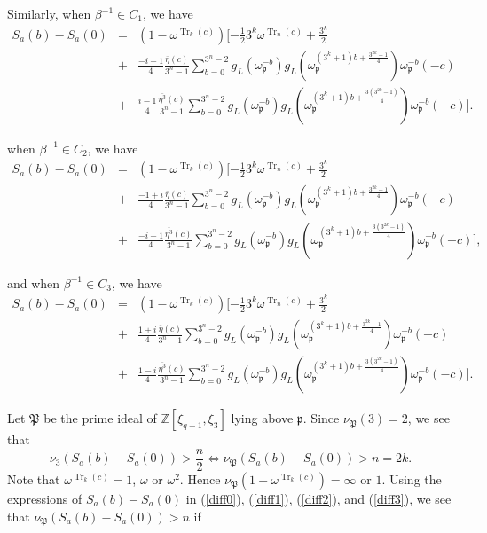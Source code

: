 \documentclass[11pt, reqno]{amsart}
\newcommand{\Zz}{{\mathbb Z}}
\def\Tr{\operatorname{Tr}}
\def\Tr{\operatorname{Tr}}
\begin{document}
Similarly, when $\beta^{-1} \in C_1$, we have
\begin{eqnarray}
S_a(b)-S_a(0)&=&(1-\omega^{\Tr_k(c)})[-\frac{1}{2}3^k\omega^{\Tr_n(c)}+\frac{3^k}{2}\nonumber \\
&+&\frac{-i-1}{4}\frac{\overline{\eta}(c)}{3^n-1}\sum_{b=0}^{3^n-2}g_L(\omega_{\mathfrak{p}}^{-b})g_L(\omega_{\mathfrak{p}}^{(3^k+1)b+\frac{3^{2k}-1}{4}})\omega_{\mathfrak{p}}^{-b}(-c)\nonumber \\
&+&\frac{i-1}{4}\frac{\overline{\eta^3}(c)}{3^n-1}\sum_{b=0}^{3^n-2}g_L(\omega_{\mathfrak{p}}^{-b})g_L(\omega_{\mathfrak{p}}^{(3^k+1)b+\frac{3(3^{2k}-1)}{4}})\omega_{\mathfrak{p}}^{-b}(-c)].\label{diff1}
\end{eqnarray}

when $\beta^{-1} \in C_2$, we have
\begin{eqnarray}
S_a(b)-S_a(0)&=&(1-\omega^{\Tr_k(c)})[-\frac{1}{2}3^k\omega^{\Tr_n(c)}+\frac{3^k}{2}\nonumber \\
&+&\frac{-1+i}{4}\frac{\overline{\eta}(c)}{3^n-1}\sum_{b=0}^{3^n-2}g_L(\omega_{\mathfrak{p}}^{-b})g_L(\omega_{\mathfrak{p}}^{(3^k+1)b+\frac{3^{2k}-1}{4}})\omega_{\mathfrak{p}}^{-b}(-c)\nonumber \\
&+&\frac{-i-1}{4}\frac{\overline{\eta^3}(c)}{3^n-1}\sum_{b=0}^{3^n-2}g_L(\omega_{\mathfrak{p}}^{-b})g_L(\omega_{\mathfrak{p}}^{(3^k+1)b+\frac{3(3^{2k}-1)}{4}})\omega_{\mathfrak{p}}^{-b}(-c)],\label{diff2}
\end{eqnarray}

and when $\beta^{-1} \in C_3$, we have
\begin{eqnarray}
S_a(b)-S_a(0)&=&(1-\omega^{\Tr_k(c)})[-\frac{1}{2}3^k\omega^{\Tr_n(c)}+\frac{3^k}{2}\nonumber \\
&+&\frac{1+i}{4}\frac{\overline{\eta}(c)}{3^n-1}\sum_{b=0}^{3^n-2}g_L(\omega_{\mathfrak{p}}^{-b})g_L(\omega_{\mathfrak{p}}^{(3^k+1)b+\frac{3^{2k}-1}{4}})\omega_{\mathfrak{p}}^{-b}(-c)\nonumber \\
&+&\frac{1-i}{4}\frac{\overline{\eta^3}(c)}{3^n-1}\sum_{b=0}^{3^n-2}g_L(\omega_{\mathfrak{p}}^{-b})g_L(\omega_{\mathfrak{p}}^{(3^k+1)b+\frac{3(3^{2k}-1)}{4}})\omega_{\mathfrak{p}}^{-b}(-c)].\label{diff3}
\end{eqnarray}

Let $\mathfrak{P}$ be the prime ideal of $\Zz[\xi_{q-1},\xi_3]$
lying above $\mathfrak{p}$. Since $\nu _{\mathfrak{P}}(3)=2$, we see
that
$$ \nu_3(S_a(b)-S_a(0))>\frac{n}{2} \iff \nu_{\mathfrak{P}}(S_a(b)-S_a(0))>n=2k.$$
Note that $\omega^{\Tr_k(c)}=1$, $\omega$ or $\omega^2$. Hence
$\nu_{\mathfrak{P}}(1-\omega^{\Tr_k(c)})=\infty$ or $1$. Using the
expressions of $S_a(b)-S_a(0)$ in (\ref{diff0}), (\ref{diff1}),
(\ref{diff2}), and (\ref{diff3}), we see that
$\nu_{\mathfrak{P}}(S_a(b)-S_a(0))>n$ if
\end{document}
